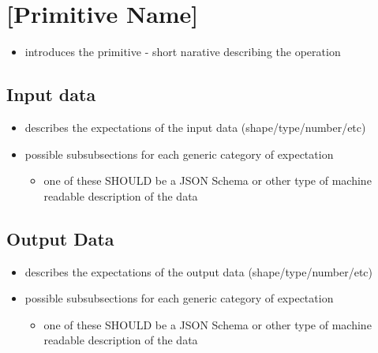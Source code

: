 \documentclass[../../main.tex]{subfiles}
\begin{document}
\section{[Primitive Name]}

\begin{itemize}

\item introduces the primitive - short narative describing the operation

\end{itemize}

\subsection{Input data}

\begin{itemize}

\item describes the expectations of the input data (shape/type/number/etc)

\item possible subsubsections for each generic category of expectation

  \begin{itemize}
  \item one of these SHOULD be a JSON Schema or other type of machine readable description of the data
  \end{itemize}

\end{itemize}

\subsection{Output Data}

\begin{itemize}

\item describes the expectations of the output data (shape/type/number/etc)

\item possible subsubsections for each generic category of expectation

  \begin{itemize}
  \item one of these SHOULD be a JSON Schema or other type of machine readable description of the data
  \end{itemize}

\end{itemize}
\end{document}
